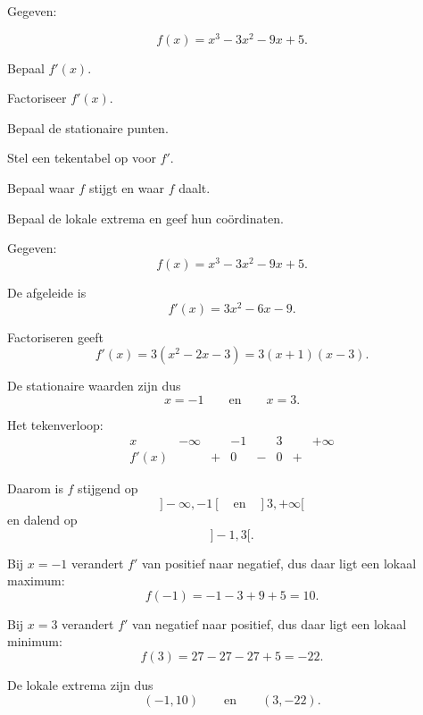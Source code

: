 \documentclass{ximera}
\begin{document}
\begin{oefening}{\oefB\ESS}

Gegeven:

\[
f(x)=x^3-3x^2-9x+5.
\]

\begin{question}
Bepaal $f'(x)$.
\end{question}

\begin{question}
Factoriseer $f'(x)$.
\end{question}

\begin{question}
Bepaal de stationaire punten.
\end{question}

\begin{question}
Stel een tekentabel op voor $f'$.
\end{question}

\begin{question}
Bepaal waar $f$ stijgt en waar $f$ daalt.
\end{question}

\begin{question}
Bepaal de lokale extrema en geef hun coördinaten.
\end{question}

\begin{oplossing}

Gegeven:
\[
f(x)=x^3-3x^2-9x+5.
\]

De afgeleide is
\[
f'(x)=3x^2-6x-9.
\]

Factoriseren geeft
\[
f'(x)=3(x^2-2x-3)
=3(x+1)(x-3).
\]

De stationaire waarden zijn dus
\[
x=-1
\qquad\text{en}\qquad
x=3.
\]

Het tekenverloop:
\[
\begin{array}{c|ccccccc}
x & -\infty & & -1 & & 3 & & +\infty\\ \hline
f'(x) & & + & 0 & - & 0 & + &
\end{array}
\]

Daarom is $f$ stijgend op
\[
]-\infty,-1[
\quad\text{en}\quad
]3,+\infty[
\]
en dalend op
\[
]-1,3[.
\]

Bij $x=-1$ verandert $f'$ van positief naar negatief, dus daar ligt een
lokaal maximum:
\[
f(-1)=-1-3+9+5=10.
\]

Bij $x=3$ verandert $f'$ van negatief naar positief, dus daar ligt een
lokaal minimum:
\[
f(3)=27-27-27+5=-22.
\]

De lokale extrema zijn dus
\[
\boxed{(-1,10)}
\qquad\text{en}\qquad
\boxed{(3,-22)}.
\]

\end{oplossing}

\end{oefening}
\end{document}
